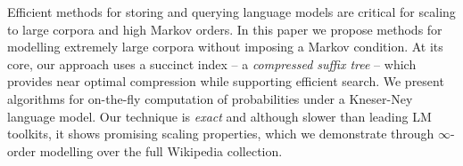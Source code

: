 Efficient methods for storing and querying language models are critical for scaling to large corpora and high Markov orders.
In this paper we propose methods for modelling extremely large corpora without
imposing a Markov condition.
At its core, our approach uses a succinct index -- a \emph{compressed suffix tree} -- which provides near optimal compression while supporting efficient search.
We present algorithms for on-the-fly computation of probabilities under a
Kneser-Ney language model.
Our technique is \emph{exact} and although slower than leading LM
toolkits, it shows promising scaling properties,
which we demonstrate through $\infty$-order modelling over the full Wikipedia collection. 


